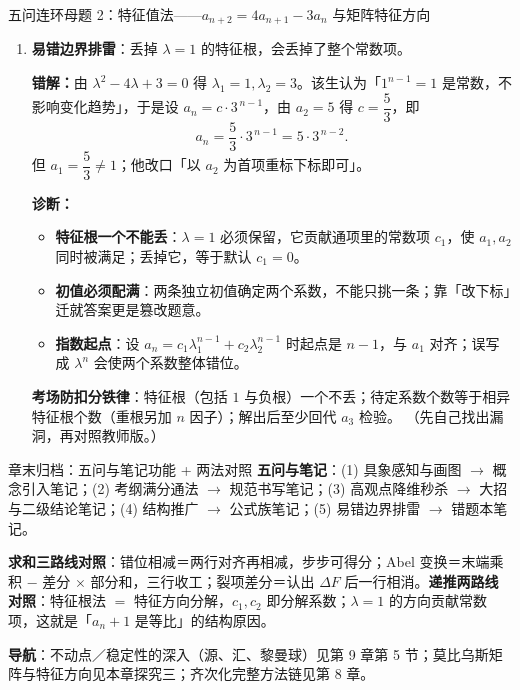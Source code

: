 \begin{methodbox}{五问连环母题 2：特征值法——$a_{n+2}=4a_{n+1}-3a_n$ 与矩阵特征方向}
\begin{enumerate}[label=(\arabic*), itemsep=5pt]
\begin{advancedonly}
若 $\lambda_1=\lambda_2=\lambda$（重根），特征方向只有一个，通项升级为
\[
a_n=(c_1+c_2\,n)\lambda^{\,n-1},
\]
多项式因子 $n$ 来自「约当块」型的耦合（对比二次曲线旋转消交叉项的一般理论，见第 8 章手术刀之五）。
\end{advancedonly}

\item \textbf{易错边界排雷}：丢掉 $\lambda=1$ 的特征根，会丢掉了整个常数项。

{\bfseries\color{red!70!black}错解：}由 $\lambda^2-4\lambda+3=0$ 得 $\lambda_1=1,\lambda_2=3$。该生认为「$1^{n-1}=1$ 是常数，不影响变化趋势」，于是设 $a_n=c\cdot3^{\,n-1}$，由 $a_2=5$ 得 $c=\dfrac53$，即
\[
a_n=\frac53\cdot3^{\,n-1}=5\cdot3^{\,n-2}.
\]
但 $a_1=\dfrac53\ne1$；他改口「以 $a_2$ 为首项重标下标即可」。

\ifteacher
{\bfseries\color{main}诊断：}
\begin{itemize}[itemsep=1pt]
\item \textbf{特征根一个不能丢}：$\lambda=1$ 必须保留，它贡献通项里的常数项 $c_1$，使 $a_1,a_2$ 同时被满足；丢掉它，等于默认 $c_1=0$。
\item \textbf{初值必须配满}：两条独立初值确定两个系数，不能只挑一条；靠「改下标」迁就答案更是篡改题意。
\item \textbf{指数起点}：设 $a_n=c_1\lambda_1^{n-1}+c_2\lambda_2^{n-1}$ 时起点是 $n-1$，与 $a_1$ 对齐；误写成 $\lambda^n$ 会使两个系数整体错位。
\end{itemize}

\textbf{考场防扣分铁律}：特征根（包括 $1$ 与负根）一个不丢；待定系数个数等于相异特征根个数（重根另加 $n$ 因子）；解出后至少回代 $a_3$ 检验。
\else
{\small（先自己找出漏洞，再对照教师版。）}
\fi
{}

\end{enumerate}
\end{methodbox}


\begin{notezone}{章末归档：五问与笔记功能 + 两法对照}
\textbf{五问与笔记}：(1) 具象感知与画图 $\to$ 概念引入笔记；(2) 考纲满分通法 $\to$ 规范书写笔记；(3) 高观点降维秒杀 $\to$ 大招与二级结论笔记；(4) 结构推广 $\to$ 公式族笔记；(5) 易错边界排雷 $\to$ 错题本笔记。

\textbf{求和三路线对照}：错位相减＝两行对齐再相减，步步可得分；Abel 变换＝末端乘积 $-$ 差分 $\times$ 部分和，三行收工；裂项差分＝认出 $\Delta F$ 后一行相消。\textbf{递推两路线对照}：特征根法 $=$ 特征方向分解，$c_1,c_2$ 即分解系数；$\lambda=1$ 的方向贡献常数项，这就是「$a_n+1$ 是等比」的结构原因。

\textbf{导航}：不动点／稳定性的深入（源、汇、黎曼球）见第 9 章第 5 节；莫比乌斯矩阵与特征方向见本章探究三；齐次化完整方法链见第 8 章。
\end{notezone}
